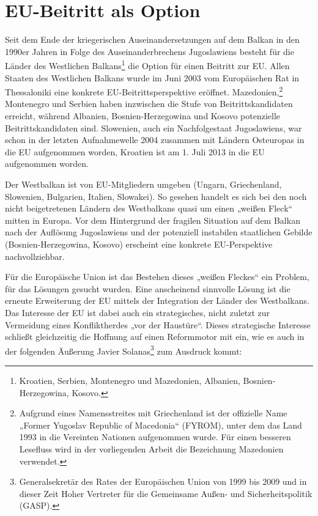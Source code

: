 \chapter{EU-Beitritt als Option}
Seit dem Ende der kriegerischen Auseinandersetzungen auf dem Balkan in den 1990er Jahren in Folge des Auseinanderbrechens Jugoslawiens besteht für die Länder des Westlichen Balkans\footnote{Kroatien, Serbien, Montenegro und Mazedonien, Albanien, Bosnien-Herzegowina, Kosovo.}  die Option für einen Beitritt zur EU. Allen Staaten des Westlichen Balkans wurde im Juni 2003 vom Europäischen Rat in Thessaloniki eine konkrete EU-Beitrittsperspektive eröffnet. Mazedonien,\footnote{Aufgrund eines Namensstreites mit Griechenland ist der offizielle Name „Former Yugoslav Republic of Macedonia“ (FYROM), unter dem das Land 1993 in die Vereinten Nationen aufgenommen wurde. Für einen besseren Lesefluss wird in der vorliegenden Arbeit die Bezeichnung Mazedonien verwendet.} Montenegro und Serbien haben inzwischen die Stufe von Beitrittskandidaten erreicht, während Albanien, Bosnien-Herzegowina und Kosovo potenzielle Beitrittskandidaten sind. Slowenien, auch ein Nachfolgestaat Jugoslawiens, war schon in der letzten Aufnahmewelle 2004 zusammen mit Ländern Osteuropas in die EU aufgenommen worden, Kroatien ist am 1. Juli 2013 in die EU aufgenommen worden.\par

Der Westbalkan ist von EU-Mitgliedern umgeben (Ungarn, Griechenland, Slowenien, Bulgarien, Italien, Slowakei). So gesehen handelt es sich bei den noch nicht beigetretenen Ländern des Westbalkans quasi um einen „weißen Fleck“ mitten in Europa. Vor dem Hintergrund der fragilen Situation auf dem Balkan nach der Auflösung Jugoslawiens und der potenziell instabilen staatlichen Gebilde (Bosnien-Herzegowina, Kosovo) erscheint eine konkrete EU-Perspektive nachvollziehbar.\par

Für die Europäische Union ist das Bestehen dieses „weißen Fleckes“ ein Problem, für das Lösungen gesucht wurden. Eine anscheinend sinnvolle Lösung ist die erneute Erweiterung der EU mittels der Integration der Länder des Westbalkans. Das Interesse der EU ist dabei auch ein strategisches, nicht zuletzt zur Vermeidung eines Konfliktherdes „vor der Haustüre“. Dieses strategische Interesse schließt gleichzeitig die Hoffnung auf einen Reformmotor mit ein, wie es auch in der folgenden Äußerung Javier Solanas\footnote{Generalsekretär des Rates der Europäischen Union von 1999 bis 2009 und in dieser Zeit Hoher Vertreter für die Gemeinsame Außen- und Sicherheitspolitik (GASP).} zum Ausdruck kommt:\par

